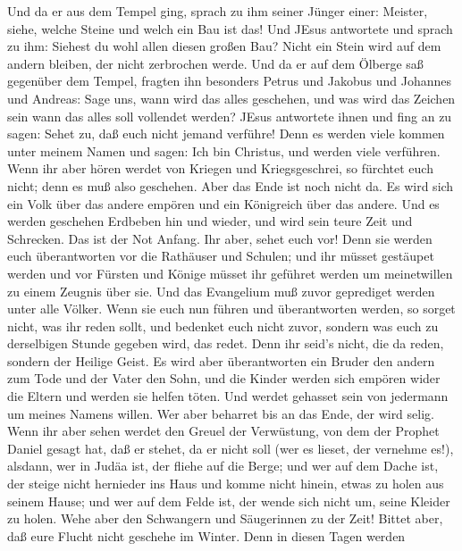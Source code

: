  Und da er aus dem Tempel ging, sprach zu ihm seiner Jünger
einer: Meister, siehe, welche Steine und welch ein Bau ist das!
 Und JEsus antwortete und sprach zu ihm: Siehest du wohl
allen diesen großen Bau? Nicht ein Stein wird auf dem andern bleiben,
der nicht zerbrochen werde.  Und da er auf dem Ölberge saß
gegenüber dem Tempel, fragten ihn besonders Petrus und Jakobus und
Johannes und Andreas:  Sage uns, wann wird das alles
geschehen, und was wird das Zeichen sein wann das alles soll vollendet
werden?  JEsus antwortete ihnen und fing an zu sagen: Sehet
zu, daß euch nicht jemand verführe!  Denn es werden viele
kommen unter meinem Namen und sagen: Ich bin Christus, und werden viele
verführen.  Wenn ihr aber hören werdet von Kriegen und
Kriegsgeschrei, so fürchtet euch nicht; denn es muß also geschehen. Aber
das Ende ist noch nicht da.  Es wird sich ein Volk über das
andere empören und ein Königreich über das andere. Und es werden
geschehen Erdbeben hin und wieder, und wird sein teure Zeit und
Schrecken. Das ist der Not Anfang.  Ihr aber, sehet euch
vor! Denn sie werden euch überantworten vor die Rathäuser und Schulen;
und ihr müsset gestäupet werden und vor Fürsten und Könige müsset ihr
geführet werden um meinetwillen zu einem Zeugnis über sie. 
Und das Evangelium muß zuvor geprediget werden unter alle Völker.
 Wenn sie euch nun führen und überantworten werden, so
sorget nicht, was ihr reden sollt, und bedenket euch nicht zuvor,
sondern was euch zu derselbigen Stunde gegeben wird, das redet. Denn ihr
seid's nicht, die da reden, sondern der Heilige Geist.  Es
wird aber überantworten ein Bruder den andern zum Tode und der Vater den
Sohn, und die Kinder werden sich empören wider die Eltern und werden sie
helfen töten.  Und werdet gehasset sein von jedermann um
meines Namens willen. Wer aber beharret bis an das Ende, der wird selig.
 Wenn ihr aber sehen werdet den Greuel der Verwüstung, von
dem der Prophet Daniel gesagt hat, daß er stehet, da er nicht soll (wer
es lieset, der vernehme es!), alsdann, wer in Judäa ist, der fliehe auf
die Berge;  und wer auf dem Dache ist, der steige nicht
hernieder ins Haus und komme nicht hinein, etwas zu holen aus seinem
Hause;  und wer auf dem Felde ist, der wende sich nicht um,
seine Kleider zu holen.  Wehe aber den Schwangern und
Säugerinnen zu der Zeit!  Bittet aber, daß eure Flucht
nicht geschehe im Winter.  Denn in diesen Tagen werden
